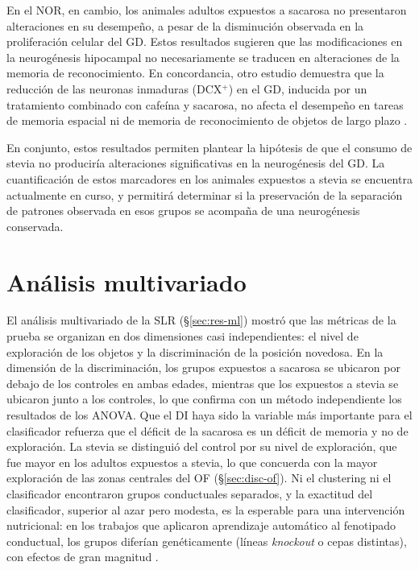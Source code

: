 En el NOR, en cambio, los animales adultos expuestos a sacarosa no presentaron alteraciones en su desempeño, a pesar de la disminución observada en la proliferación celular del GD. Estos resultados sugieren que las modificaciones en la neurogénesis hipocampal no necesariamente se traducen en alteraciones de la memoria de reconocimiento. En concordancia, otro estudio demuestra que la reducción de las neuronas inmaduras (DCX$^{+}$) en el GD, inducida por un tratamiento combinado con cafeína y sacarosa, no afecta el desempeño en tareas de memoria espacial ni de memoria de reconocimiento de objetos de largo plazo \cite{xu2018sucrose}.

En conjunto, estos resultados permiten plantear la hipótesis de que el consumo de stevia no produciría alteraciones significativas en la neurogénesis del GD. La cuantificación de estos marcadores en los animales expuestos a stevia se encuentra actualmente en curso, y permitirá determinar si la preservación de la separación de patrones observada en esos grupos se acompaña de una neurogénesis conservada.

\section{Análisis multivariado}\label{sec:disc-ml}

El análisis multivariado de la SLR (\S\ref{sec:res-ml}) mostró que las métricas de la prueba se organizan en dos dimensiones casi independientes: el nivel de exploración de los objetos y la discriminación de la posición novedosa. En la dimensión de la discriminación, los grupos expuestos a sacarosa se ubicaron por debajo de los controles en ambas edades, mientras que los expuestos a stevia se ubicaron junto a los controles, lo que confirma con un método independiente los resultados de los ANOVA. Que el DI haya sido la variable más importante para el clasificador refuerza que el déficit de la sacarosa es un déficit de memoria y no de exploración. La stevia se distinguió del control por su nivel de exploración, que fue mayor en los adultos expuestos a stevia, lo que concuerda con la mayor exploración de las zonas centrales del OF (\S\ref{sec:disc-of}). Ni el clustering ni el clasificador encontraron grupos conductuales separados, y la exactitud del clasificador, superior al azar pero modesta, es la esperable para una intervención nutricional: en los trabajos que aplicaron aprendizaje automático al fenotipado conductual, los grupos diferían genéticamente (líneas \textit{knockout} o cepas distintas), con efectos de gran magnitud \cite{lukovikov2026cylinder,geros2020tracking}.

